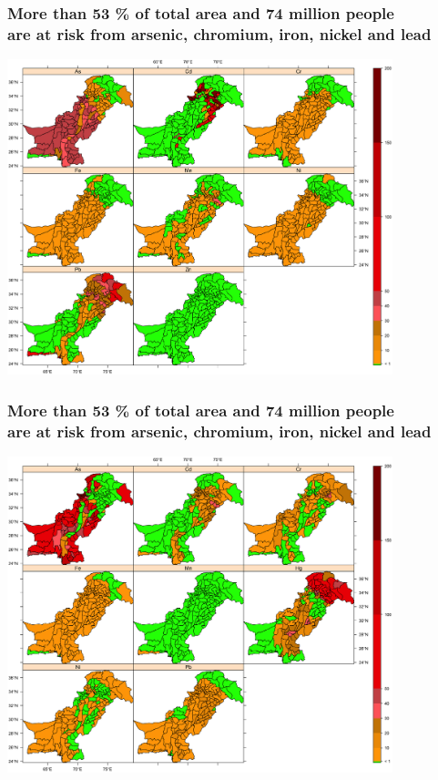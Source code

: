 \documentclass[10pt, compress]{beamer}
\begin{document}
\begin{frame}
  \frametitle{More than 53 \% of total area and 74 million people \protect\\ are at risk from arsenic, chromium, iron, nickel and lead}
  \centering 
  \includegraphics[width=0.84\textwidth]{images/Ground_water_risk.png}
\end{frame}


\begin{frame}
  \frametitle{More than 53 \% of total area and 74 million people \protect\\ are at risk from arsenic, chromium, iron, nickel and lead}
  \centering
  \includegraphics[width=0.84\textwidth]{images/Surface_water_risk.png}
\end{frame}
\end{document}
